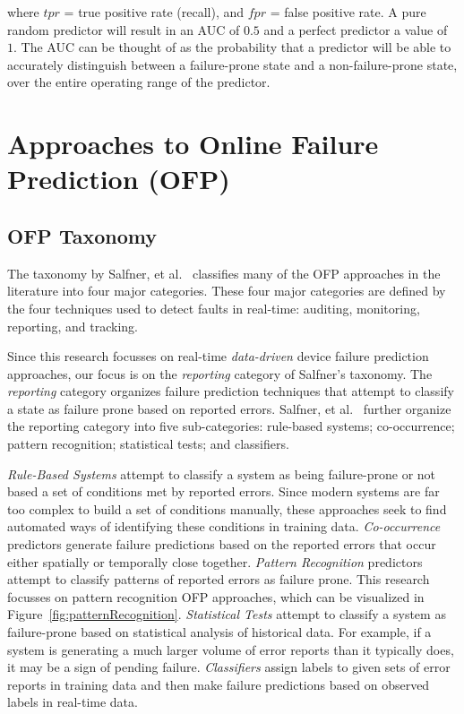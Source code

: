 \noindent
where $tpr$ = true positive rate (recall), and $fpr$ = false positive rate.  A
pure random predictor will result in an AUC of $0.5$ and a perfect predictor a
value of~$1$.  The AUC can be thought of as the probability that a predictor
will be able to accurately distinguish between a failure-prone state and a
non-failure-prone state, over the entire operating range of the predictor.

\section{Approaches to Online Failure Prediction (OFP)} \label{approaches}
\subsection{OFP Taxonomy}
The taxonomy by Salfner, et al.~\cite{salfnerSurvey} classifies many of the OFP
approaches in the literature into four major categories.  These four major
categories are defined by the four techniques used to detect faults in
real-time: auditing, monitoring, reporting, and tracking.

Since this research focusses on real-time \emph{data-driven} device failure
prediction approaches, our focus is on the \emph{reporting} category of
Salfner's taxonomy.  The \emph{reporting} category organizes failure prediction
techniques that attempt to classify a state as failure prone based on reported
errors.  Salfner, et al.~\cite{salfnerSurvey} further organize the reporting
category into five sub-categories: rule-based systems; co-occurrence; pattern
recognition; statistical tests; and classifiers.

\emph{Rule-Based Systems} attempt to classify a system as being failure-prone
or not based a set of conditions met by reported errors.  Since modern systems
are far too complex to build a set of conditions manually, these approaches
seek to find automated ways of identifying these conditions in training data.
\emph{Co-occurrence} predictors generate failure predictions based on the
reported errors that occur either spatially or temporally close together.
\emph{Pattern Recognition} predictors attempt to classify patterns of reported
errors as failure prone.  This research focusses on pattern recognition OFP
approaches, which can be visualized in Figure~\ref{fig:patternRecognition}.
\emph{Statistical Tests} attempt to classify a system as failure-prone based on
statistical analysis of historical data.  For example, if a system is
generating a much larger volume of error reports than it typically does, it may
be a sign of pending failure.  \emph{Classifiers} assign labels to given sets
of error reports in training data and then make failure predictions based on
observed labels in real-time data.

